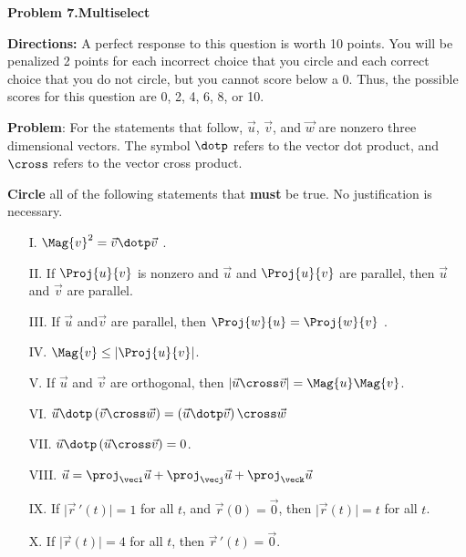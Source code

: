 \documentclass{ximera}
\begin{document}
\textbf{Problem 7.}\textbf{Multiselect}

\vspace{3mm}

\textbf{Directions:} A perfect response to this question is worth 10 points.  You will be penalized 2 points for each incorrect choice that you circle and each correct choice that you do not circle, but you cannot score below a 0.  Thus, the possible scores for this question are 0, 2, 4, 6, 8, or 10.  

\vspace{3mm}


\textbf{Problem}:  For the statements that follow, $\vec{u}$, $\vec{v}$, and $\vec{w}$ are nonzero three dimensional vectors.  The symbol $\dotp$ refers to the vector dot product, and $\cross$ refers to the vector cross product.  

\vspace{3mm}

\textbf{Circle} all of the following statements that \textbf{must} be true.  No justification is necessary.

\vspace{3mm}
\begin{itemize}
\item[I.] $\Mag{v}^2 = \vec{v} \dotp \vec{v}$ .   \\[3ex]
\item[II.] If $\Proj{u}{v}$ is nonzero and $\vec{u}$ and $\Proj{u}{v}$ are parallel, then $\vec{u}$ and $\vec{v}$ are parallel.  \\[3ex]
\item[III.] If $\vec{u}$ and$ \vec{v}$ are parallel, then $\Proj{w}{u} = \Proj{w}{v}$ .     \\ [3 ex]
\item[IV.] $\Mag{v} \leq  \left|\Proj{u}{v}\right|$.  \\[3ex]
\item[V.]  If $\vec{u}$ and $\vec{v}$ are orthogonal, then $\left|\vec{u}  \cross \vec{v} \right| = \Mag{u}\Mag{v}$.   \\ [3 ex]
\item[VI.] $\vec{u} \dotp \left(\vec{v} \cross \vec{w}\right) = \left(\vec{u} \dotp \vec{v}\right) \cross \vec{w}$  \\[3ex]
\item[VII.] $\vec{u} \dotp \left(\vec{u} \cross \vec{v}\right) = 0 $. \\[3ex]
\item[VIII.]  $\vec{u} = \proj_{\veci} \vec{u} + \proj_{\vecj} \vec{u}+\proj_{\veck} \vec{u}$ \\ [3 ex]
\item[IX.] If $\big| \vec{r} \, '(t) \big| = 1$ for all $t$, and $\vec{r}(0) =\vec{0}$, then $\big|\vec{r} (t)\big| = t$ for all $t$.\\[3ex]
\item[X.] If $\big| \vec{r} (t) \big| = 4$ for all $t$, then $\vec{r} \, ' (t) = \vec{0}$.

\vspace{3mm}



\end{itemize}
\end{document}
